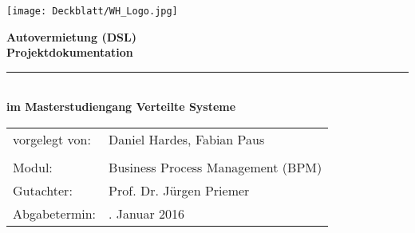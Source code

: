 \thispagestyle{plain}
\begin{titlepage}

\begin{center}

\texttt{[image: Deckblatt/WH\_Logo.jpg]}

\vspace{2cm}

\Huge{\textbf{Autovermietung (DSL)}}\\[1.5ex]
\Large{\textbf{Projektdokumentation}}
\rule{\textwidth}{0.4pt}\\[3.0ex]

\large{\textbf{im Masterstudiengang Verteilte Systeme}}\\[3.0ex]

\normalsize
\begin{tabular}{ll}\\
	vorgelegt von: 
	& \quad Daniel Hardes, Fabian Paus \\[1.2ex]
	& \quad \\[1.2ex]
	Modul:  & \quad Business Process Management (BPM) \\[1.2ex]
	Gutachter:  & \quad Prof. Dr. Jürgen Priemer \\[1.2ex]
	Abgabetermin:  & \quad 20. Januar 2016\\[1.2ex]
\end{tabular}

\end{center}

\end{titlepage}
